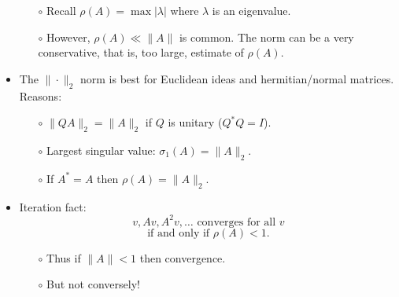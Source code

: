 \documentclass{amsart}
\newcommand{\alert}[1]{{\color{red} #1}}
\begin{document}
\begin{itemize}
\begin{itemize}
  \item[$\circ$] Recall $\rho(A) = \max |\lambda|$ where $\lambda$ is an eigenvalue.
  \item[$\circ$] However, $\rho(A)\ll\|A\|$ is common.  The norm can be a very conservative, that is, too large, estimate of $\rho(A)$.
  \end{itemize}
\item The $\|\cdot\|_2$ norm is best for \alert{Euclidean ideas} and \alert{hermitian/normal matrices}.  Reasons: 
  \begin{itemize}
  \item[$\circ$]  $\|QA\|_2 = \|A\|_2$ if $Q$ is unitary ($Q^* Q = I$).
  \item[$\circ$]  Largest singular value: $\sigma_1(A) = \|A\|_2$.
  \item[$\circ$]  If $A^*=A$ then $\rho(A)=\|A\|_2$.
  \end{itemize}
\item \alert{Iteration} fact:
    $$v, Av, A^2v, \dots \text{ converges for all $v$}$$
    $$\text{if and only if } \rho(A)<1.$$
  \begin{itemize}
  \item[$\circ$] Thus \alert{if} $\|A\|<1$ \alert{then} convergence.
  \item[$\circ$] But not conversely!
  \end{itemize}
\end{itemize}
\end{document}
